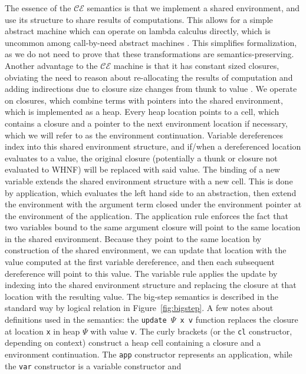 The essence of the $\mathcal{CE}$ semantics is that we implement a shared
environment, and use its structure to share results of computations. This allows
for a simple abstract machine which can operate on lambda calculus directly,
which is uncommon among call-by-need abstract machines
\cite{jonesstg,launchburynatural,TIM,johnsson1984efficient}. This simplifies
formalization, as we do not need to prove that these transformations are
semantics-preserving. Another advantage to the $\mathcal{CE}$ machine is that it
has constant sized closures, obviating the need to reason about re-allocating
the results of computation and adding indirections due to closure size changes
from thunk to value \cite{jonesstg}. We operate on closures, which combine terms with
pointers into the shared environment, which is implemented as a heap. Every heap
location points to a cell, which contains a closure and a pointer to the next
environment location if necessary, which we will refer to as the environment
continuation. Variable dereferences index into this shared environment
structure, and if/when a dereferenced location evaluates to a value, the
original closure (potentially a thunk or closure not evaluated to WHNF) will be
replaced with said value. The binding of a new variable extends the shared
environment structure with a new cell. This is done by application, which
evaluates the left hand side to an
abstraction, then extend the environment with the argument term closed under the
environment pointer at the environment of the application. The application rule
enforces the fact that two variables bound to the same argument closure will
point to the same location in the shared environment. Because they point to the
same location by construction of the shared environment, we can update that
location with the value computed at the first variable dereference, and then
each subsequent dereference will point to this value. The variable rule applies
the update by indexing into the shared environment structure and replacing the
closure at that location with the resulting value. The big-step semantics is
described in the standard way by logical relation in Figure~\ref{fig:bigstep}. A
few notes about definitions used in the semantics: the \texttt{update $\Psi$ x
v} function replaces the closure at location \texttt{x} in heap $\Psi$ with
value \texttt{v}. The curly brackets (or the \texttt{cl} constructor,
depending on context) construct a heap cell containing a closure and a
environment continuation. The \texttt{app} constructor represents an
application, while the \texttt{var} constructor is a variable constructor and
